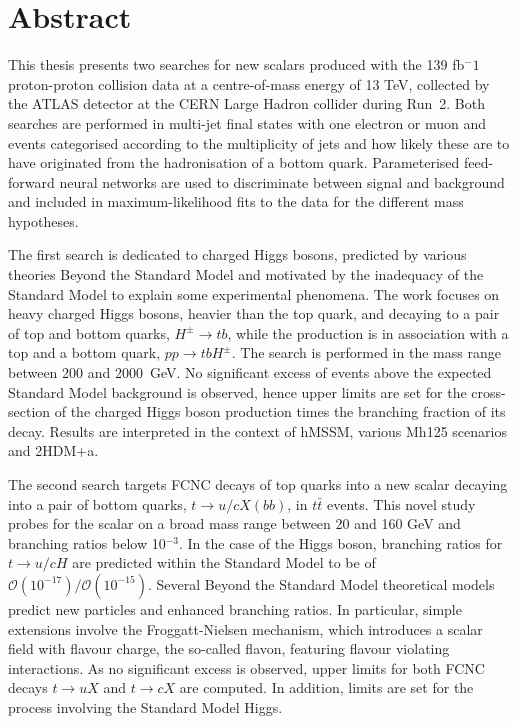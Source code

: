 \chapter*{Abstract}


This thesis presents two searches for new scalars produced with the 139 fb$^-1$ proton-proton collision data at a centre-of-mass energy of 13 TeV, collected by the ATLAS detector at the CERN Large Hadron collider during Run~2.
Both searches are performed in multi-jet final states with one electron or muon and events categorised according to the multiplicity of jets and how likely these are to have originated from the hadronisation of a bottom quark. Parameterised feed-forward neural networks are used to discriminate between signal and background and included in maximum-likelihood fits to the data for the different mass hypotheses.

The first search is dedicated to charged Higgs bosons, predicted by various theories Beyond the Standard Model and motivated by the inadequacy of the Standard Model to explain some experimental phenomena. The work focuses on heavy charged Higgs bosons, heavier than the top quark, and decaying to a pair of top and bottom quarks, $H^\pm\to tb$, while the production is in association with a top and a bottom quark, $pp\to tbH^\pm$.
The search is performed in the mass range between 200 and 2000~GeV. No significant excess of events above the expected Standard Model background is observed, hence upper limits are set for the cross-section of the charged Higgs boson production times the branching fraction of its decay. Results are interpreted in the context of hMSSM, various Mh125 scenarios and 2HDM+a.

The second search targets FCNC decays of top quarks into a new scalar decaying into a pair of bottom quarks, $t \to u/c X(bb)$, in $t\bar{t}$ events. This novel study probes for the scalar on a broad mass range between 20 and 160 GeV and branching ratios below 10$^{-3}$. In the case of the Higgs boson, branching ratios for $t \to u/c H$ are predicted within the Standard Model to be of $\mathcal{O}(10^{-17})/\mathcal{O}(10^{-15})$. Several Beyond the Standard Model theoretical models predict new particles and enhanced branching ratios. In particular, simple extensions involve the Froggatt-Nielsen mechanism, which introduces a scalar field with flavour charge, the so-called flavon, featuring flavour violating interactions. As no significant excess is observed, upper limits for both FCNC decays $t\to uX$ and $t\to cX$ are computed. In addition, limits are set for the process involving the Standard Model Higgs.